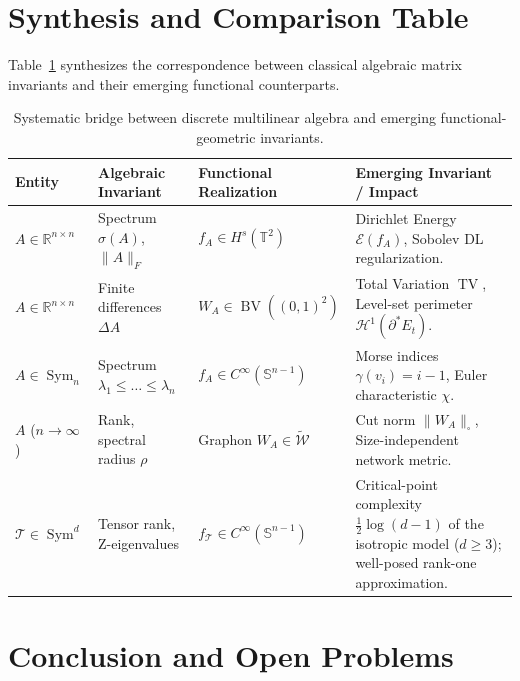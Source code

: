 \documentclass[11pt,a4paper,reqno]{amsart}
\theoremstyle{definition}
\numberwithin{equation}{section}
\providecommand{\R}{\mathbb{R}}
\providecommand{\Sph}{\mathbb{S}}
\newcommand{\Tor}{\mathbb{T}}
\providecommand{\BV}{\operatorname{BV}}
\providecommand{\TV}{\operatorname{TV}}
\providecommand{\cutnorm}[1]{\|#1\|_{\square}}
\begin{document}
\section{Synthesis and Comparison Table}
\label{sec:synthesis}

Table~\ref{tab:comparison} synthesizes the correspondence between classical algebraic matrix invariants and their emerging functional counterparts.

\begin{table}[htbp]
\centering
\footnotesize
\renewcommand{\arraystretch}{1.3}
\begin{tabularx}{\textwidth}{@{}l X X X@{}}
\toprule
\textbf{Entity} & \textbf{Algebraic Invariant} & \textbf{Functional Realization} & \textbf{Emerging Invariant / Impact} \\
\midrule
$A \in \R^{n \times n}$ & Spectrum $\sigma(A)$, $\|A\|_F$ & $f_A \in H^s(\Tor^2)$ & Dirichlet Energy $\mathcal{E}(f_A)$, Sobolev DL regularization. \\
$A \in \R^{n \times n}$ & Finite differences $\Delta A$ & $W_A \in \BV((0,1)^2)$ & Total Variation $\TV$, Level-set perimeter $\mathcal{H}^1(\partial^* E_t)$. \\
$A \in \operatorname{Sym}_n$ & Spectrum $\lambda_1 \le \dots \le \lambda_n$ & $f_A \in C^\infty(\Sph^{n-1})$ & Morse indices $\gamma(v_i) = i-1$, Euler characteristic $\chi$. \\
$A$ ($n \to \infty$) & Rank, spectral radius $\rho$ & Graphon $W_A \in \widetilde{\mathcal{W}}$ & Cut norm $\cutnorm{W_A}$, Size-independent network metric. \\
$\mathcal{T} \in \operatorname{Sym}^d$ & Tensor rank, Z-eigenvalues & $f_{\mathcal{T}} \in C^\infty(\Sph^{n-1})$ & Critical-point complexity $\frac12\log(d-1)$ of the isotropic model ($d \ge 3$); well-posed rank-one approximation. \\
\bottomrule
\end{tabularx}
\caption{Systematic bridge between discrete multilinear algebra and emerging functional-geometric invariants.}
\label{tab:comparison}
\end{table}

\section{Conclusion and Open Problems}
\label{sec:conclusion}
\end{document}
